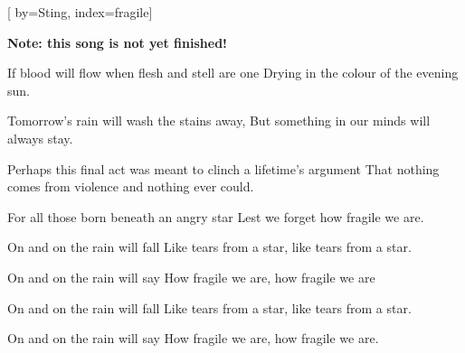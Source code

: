 
[%
    by={Sting},
    index={fragile}]


    \label{fragile}

    \textbf{Note: this song is not yet finished!}

    \beginverse
        If blood will flow when flesh and stell are one
        Drying in the colour of the evening sun.

        Tomorrow's rain will wash the stains away,
        But something in our minds will always stay.

        Perhaps this final act was meant to clinch a lifetime's argument
        That nothing comes from violence and nothing ever could.

        For all those born beneath an angry star
        Lest we forget how fragile we are.
    \endverse

    \beginchorus
        On and on the rain will fall
        Like tears from a star, like tears from a star.

        On and on the rain will say
        How fragile we are, how fragile we are
    \endchorus

    \beginverse*
    \endverse

    \beginchorus
        On and on the rain will fall
        Like tears from a star, like tears from a star.

        On and on the rain will say
        How fragile we are, how fragile we are. 
    \endchorus
\endsong
